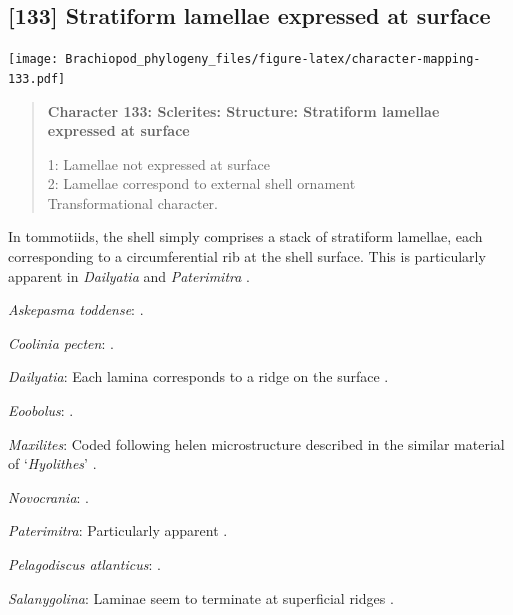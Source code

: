 \documentclass[openany]{book}
\begin{document}
\subsection*{{[}133{]} Stratiform lamellae expressed at
surface}\label{stratiform-lamellae-expressed-at-surface}

\texttt{[image: Brachiopod\_phylogeny\_files/figure-latex/character-mapping-133.pdf]}

\begin{quote}
\textbf{Character 133: Sclerites: Structure: Stratiform lamellae
expressed at surface}

1: Lamellae not expressed at surface\\
2: Lamellae correspond to external shell ornament\\
Transformational character.
\end{quote}

In tommotiids, the shell simply comprises a stack of stratiform
lamellae, each corresponding to a circumferential rib at the shell
surface. This is particularly apparent in \emph{Dailyatia}
\citep{Skovsted2015Theearly} and \emph{Paterimitra}
\citep{Larsson2014iPaterimitra}.

\hypertarget{Askepasma_toddense-coding-133}{}
\emph{Askepasma toddense}: \citet{Topper2013Theoldest}.

\hypertarget{Coolinia_pecten-coding-133}{}
\emph{Coolinia pecten}: \citet{Dewing2004}.

\hypertarget{Dailyatia-coding-133}{}
\emph{Dailyatia}: Each lamina corresponds to a ridge on the surface
\citep{Skovsted2015Theearly}.

\hypertarget{Eoobolus-coding-133}{}
\emph{Eoobolus}: \citet{Balthasar2007Anearly}.

\hypertarget{Maxilites-coding-133}{}
\emph{Maxilites}: Coded following helen microstructure described in the
similar material of `\emph{Hyolithes}' \citep{MartiMus2007}.

\hypertarget{Novocrania-coding-133}{}
\emph{Novocrania}: \citet{Parkinson2005}.

\hypertarget{Paterimitra-coding-133}{}
\emph{Paterimitra}: Particularly apparent
\citep{Larsson2014iPaterimitra}.

\hypertarget{Pelagodiscus_atlanticus-coding-133}{}
\emph{Pelagodiscus atlanticus}: \citet{Williams1998Chemicostructural}.

\hypertarget{Salanygolina-coding-133}{}
\emph{Salanygolina}: Laminae seem to terminate at superficial ridges
\citep{Holmer2009Theenigmatic}.
\end{document}
